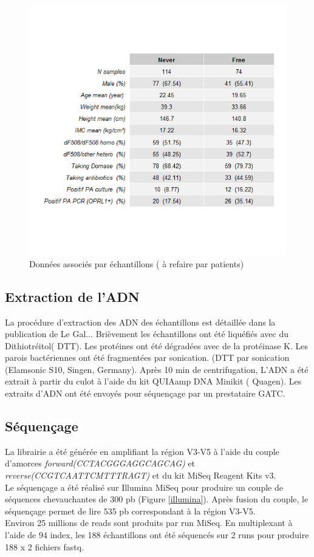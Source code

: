 \documentclass[12pt,a4paper]{article}
\begin{document}
\begin{figure}[ht]
\begin{center}
\includegraphics[scale=0.8]{img/summary.png}\hfill
\end{center}
\caption{Données associés par échantillons ( à refaire par patients)}
\label{summary}
\end{figure}



\subsection{Extraction de l’ADN}

La procédure d'extraction des ADN des échantillons est détaillée dans la publication de Le Gal... Brièvement les échantillons ont été liquéfiés avec du Dithiotréitol( DTT). Les protéines ont été dégradées avec de la protéinase K.
Les parois bactériennes ont été fragmentées par sonication. (DTT par sonication (Elamsonic S10, Singen, Germany). Après 10 min de centrifugation, L’ADN a été extrait à partir du culot à l'aide du kit QUIAamp DNA Minikit ( Quagen).
Les extraits d’ADN ont été envoyés pour séquençage par un prestataire GATC.

\subsection{Séquençage}
La librairie a été générée en amplifiant la région V3-V5 à l’aide du couple d’amorces  \textit{forward(CCTACGGGAGGCAGCAG)} et \textit{reverse(CCGTCAATTCMTTTRAGT)} et du kit MiSeq Reagent Kits v3. \\
Le séquençage a été réalisé sur Illumina MiSeq pour produire un couple de séquences chevauchantes de 300 pb (Figure \ref{illumina}). Après fusion du couple, le séquençage permet de lire  535 pb correspondant à la région V3-V5.\\
Environ 25 millions de reads sont produits par run MiSeq. En multiplexant à l’aide de 94 index, les 188 échantillons ont été séquencés sur 2 runs pour produire 188 x 2 fichiers fastq.
\end{document}
